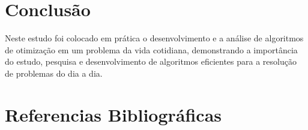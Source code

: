 \documentclass[12pt]{article}
\begin{document}
\section{Conclusão}

Neste estudo foi colocado em prática o desenvolvimento e a análise de algoritmos de otimização em um problema da vida cotidiana, demonstrando a importância do estudo, pesquisa e desenvolvimento de algoritmos eficientes para a resolução de problemas do dia a dia.

\section{Referencias Bibliográficas}



%
%
\end{document}
